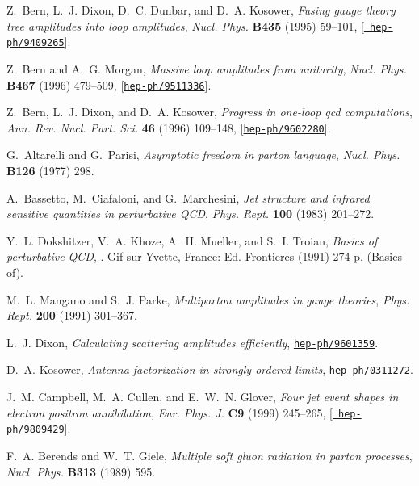 \documentclass[paper,notoc,nohyper]{JHEP3}
\begin{document}
\begin{thebibliography}{10}
Z.~Bern, L.~J. Dixon, D.~C. Dunbar, and D.~A. Kosower, {\it Fusing gauge theory
  tree amplitudes into loop amplitudes},  {\em Nucl. Phys.} {\bf B435} (1995)
  59--101, [\href{http://xxx.lanl.gov/abs/hep-ph/9409265}{{\tt
  hep-ph/9409265}}].

Z.~Bern and A.~G. Morgan, {\it Massive loop amplitudes from unitarity},  {\em
  Nucl. Phys.} {\bf B467} (1996) 479--509,
  [\href{http://xxx.lanl.gov/abs/hep-ph/9511336}{{\tt hep-ph/9511336}}].

Z.~Bern, L.~J. Dixon, and D.~A. Kosower, {\it Progress in one-loop qcd
  computations},  {\em Ann. Rev. Nucl. Part. Sci.} {\bf 46} (1996) 109--148,
  [\href{http://xxx.lanl.gov/abs/hep-ph/9602280}{{\tt hep-ph/9602280}}].

G.~Altarelli and G.~Parisi, {\it Asymptotic freedom in parton language},  {\em
  Nucl. Phys.} {\bf B126} (1977) 298.

A.~Bassetto, M.~Ciafaloni, and G.~Marchesini, {\it Jet structure and infrared
  sensitive quantities in perturbative {QCD}},  {\em Phys. Rept.} {\bf 100}
  (1983) 201--272.

Y.~L. Dokshitzer, V.~A. Khoze, A.~H. Mueller, and S.~I. Troian, {\it Basics of
  perturbative {QCD}}, . Gif-sur-Yvette, France: Ed. Frontieres (1991) 274 p.
  (Basics of).

M.~L. Mangano and S.~J. Parke, {\it Multiparton amplitudes in gauge theories},
  {\em Phys. Rept.} {\bf 200} (1991) 301--367.

L.~J. Dixon, {\it Calculating scattering amplitudes efficiently},
  \href{http://xxx.lanl.gov/abs/hep-ph/9601359}{{\tt hep-ph/9601359}}.

D.~A. Kosower, {\it Antenna factorization in strongly-ordered limits},
  \href{http://xxx.lanl.gov/abs/hep-ph/0311272}{{\tt hep-ph/0311272}}.

J.~M. Campbell, M.~A. Cullen, and E.~W.~N. Glover, {\it Four jet event shapes
  in electron positron annihilation},  {\em Eur. Phys. J.} {\bf C9} (1999)
  245--265, [\href{http://xxx.lanl.gov/abs/hep-ph/9809429}{{\tt
  hep-ph/9809429}}].

F.~A. Berends and W.~T. Giele, {\it Multiple soft gluon radiation in parton
  processes},  {\em Nucl. Phys.} {\bf B313} (1989) 595.


\end{thebibliography}
\end{document}
